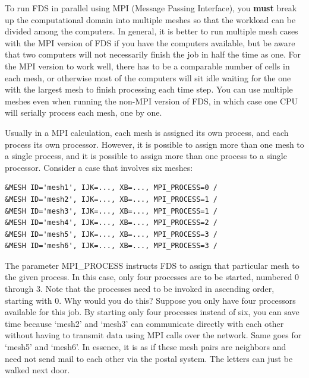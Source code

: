 \documentclass[11pt]{book}
\begin{document}
To run FDS in parallel using MPI (Message Passing Interface), you {\bf must} break up the computational domain into multiple meshes so that the workload can be divided among the computers. In general, it is better to run multiple mesh cases with the MPI version of FDS if you have the computers available, but be aware that two computers will not necessarily finish the job in half the time as one. For the MPI version to work well, there has to be a comparable number of cells in each mesh, or otherwise most of the computers will sit idle waiting for the one with the largest mesh to finish processing each time step. You can use multiple meshes even when running the non-MPI version of FDS, in which case one CPU will serially process each mesh, one by one.

Usually in a MPI calculation, each mesh is assigned its own process, and each process its own processor. However, it is possible to assign more than one mesh to a single process, and it is possible to assign more than one process to a single processor. Consider a case that involves six meshes:
\begin{lstlisting}
&MESH ID='mesh1', IJK=..., XB=..., MPI_PROCESS=0 /
&MESH ID='mesh2', IJK=..., XB=..., MPI_PROCESS=1 /
&MESH ID='mesh3', IJK=..., XB=..., MPI_PROCESS=1 /
&MESH ID='mesh4', IJK=..., XB=..., MPI_PROCESS=2 /
&MESH ID='mesh5', IJK=..., XB=..., MPI_PROCESS=3 /
&MESH ID='mesh6', IJK=..., XB=..., MPI_PROCESS=3 /
\end{lstlisting}
The parameter {\ct MPI\_PROCESS} instructs FDS to assign that particular mesh to the given process. In this case, only four processes are to be started, numbered 0 through 3. Note that the processes need to be invoked in ascending order, starting with 0. Why would you do this? Suppose you only have four processors available for this job. By starting only four processes instead of six, you can save time because `mesh2' and `mesh3' can communicate directly with each other without having to transmit data using MPI calls over the network. Same goes for `mesh5' and `mesh6'. In essence, it is as if these mesh pairs are neighbors and need not send mail to each other via the postal system. The letters can just be walked next door.
\end{document}

